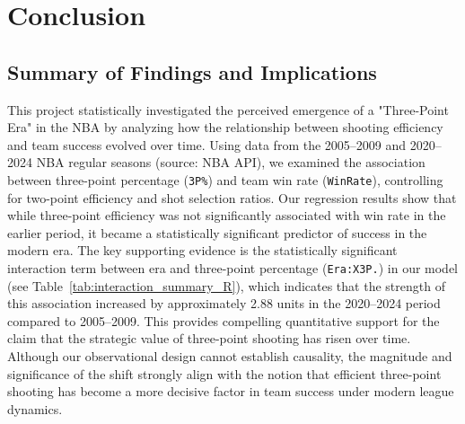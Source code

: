 \documentclass[11pt, a4paper]{article} %
\begin{document}


\section{Conclusion} %

\subsection{Summary of Findings and Implications} %

This project statistically investigated the perceived emergence of a "Three-Point Era" in the NBA by analyzing how the relationship 
between shooting efficiency and team success evolved over time. Using data from the 2005–2009 and 2020–2024 NBA regular seasons 
(source: NBA API), we examined the association between three-point percentage (\texttt{3P\%}) and team win rate (\texttt{WinRate}), 
controlling for two-point efficiency and shot selection ratios. Our regression results show that while three-point efficiency was 
not significantly associated with win rate in the earlier period, it became a statistically significant predictor of success in the 
modern era. The key supporting evidence is the statistically significant interaction term between era and three-point percentage 
(\texttt{Era:X3P.}) in our model (see Table~\ref{tab:interaction_summary_R}), which indicates that the strength of this association 
increased by approximately 2.88 units in the 2020–2024 period compared to 2005–2009. This provides compelling quantitative support 
for the claim that the strategic value of three-point shooting has risen over time. Although our observational design cannot 
establish causality, the magnitude and significance of the shift strongly align with the notion that efficient three-point 
shooting has become a more decisive factor in team success under modern league dynamics.
\end{document}
